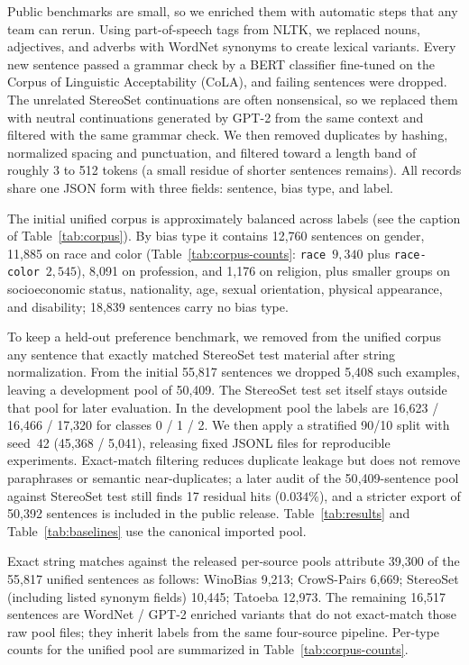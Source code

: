 \documentclass{IEEEcsmag}
\newif\ifshownotes \shownotestrue
\newcommand{\nota}[1]{\ifshownotes{\color{red}\,[\textbf{NOTA:} #1]}\fi}
\begin{document}
Public benchmarks are small, so we enriched them with automatic steps that any team can rerun. Using part-of-speech tags from NLTK, we replaced nouns, adjectives, and adverbs with WordNet synonyms to create lexical variants. Every new sentence passed a grammar check by a BERT classifier fine-tuned on the Corpus of Linguistic Acceptability (CoLA), and failing sentences were dropped. The unrelated StereoSet continuations are often nonsensical, so we replaced them with neutral continuations generated by GPT-2 from the same context and filtered with the same grammar check. We then removed duplicates by hashing, normalized spacing and punctuation, and filtered toward a length band of roughly 3 to 512 tokens (a small residue of shorter sentences remains). All records share one JSON form with three fields: sentence, bias type, and label.

The initial unified corpus is approximately balanced across labels (see the caption of Table~\ref{tab:corpus}). By bias type it contains 12,760 sentences on gender, 11,885 on race and color (Table~\ref{tab:corpus-counts}: \texttt{race}~$9{,}340$ plus \texttt{race-color}~$2{,}545$), 8,091 on profession, and 1,176 on religion, plus smaller groups on socioeconomic status, nationality, age, sexual orientation, physical appearance, and disability; 18,839 sentences carry no bias type.

To keep a held-out preference benchmark, we removed from the unified corpus any sentence that exactly matched StereoSet test material after string normalization. From the initial 55,817 sentences we dropped 5,408 such examples, leaving a development pool of 50,409. The StereoSet test set itself stays outside that pool for later evaluation. In the development pool the labels are 16,623 / 16,466 / 17,320 for classes 0 / 1 / 2. We then apply a stratified 90/10 split with seed~42 (45,368 / 5,041), releasing fixed JSONL files for reproducible experiments. Exact-match filtering reduces duplicate leakage but does not remove paraphrases or semantic near-duplicates; a later audit of the 50{,}409-sentence pool against StereoSet test still finds 17 residual hits ($0.034\%$), and a stricter export of 50{,}392 sentences is included in the public release. Table~\ref{tab:results} and Table~\ref{tab:baselines} use the canonical imported pool.

Exact string matches against the released per-source pools attribute 39,300 of the 55,817 unified sentences as follows: WinoBias 9,213; CrowS-Pairs 6,669; StereoSet (including listed synonym fields) 10,445; Tatoeba 12,973. The remaining 16,517 sentences are WordNet / GPT-2 enriched variants that do not exact-match those raw pool files; they inherit labels from the same four-source pipeline. Per-type counts for the unified pool are summarized in Table~\ref{tab:corpus-counts}.
\end{document}
